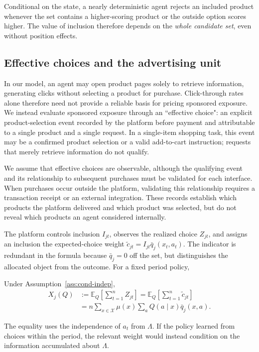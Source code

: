 \documentclass[opre,dblanonrev]{informs4}
\providecommand{\E}{\mathbb{E}}
\providecommand{\1}{\mathbf{1}}
\begin{document}
Conditional on the state, a nearly deterministic agent rejects an included product whenever the set contains a higher-scoring product or the outside option scores higher. The value of inclusion therefore depends on the \emph{whole candidate set}, even without position effects.


\subsection{Effective choices and the advertising unit}\label{sec:model-unit}

In our model, an agent may open product pages solely to retrieve information, generating clicks without selecting a product for purchase. Click-through rates alone therefore need not provide a reliable basis for pricing sponsored exposure. We instead evaluate sponsored exposure through an ``effective choice": an explicit product-selection event recorded by the platform before payment and attributable to a single product and a single request. In a single-item shopping task, this event may be a confirmed product selection or a valid add-to-cart instruction; requests that merely retrieve information do not qualify.

We assume that effective choices are observable, although the qualifying event and its relationship to subsequent purchases must be validated for each interface. When purchases occur outside the platform, validating this relationship requires a transaction receipt or an external integration. These records establish which products the platform delivered and which product was selected, but do not reveal which products an agent considered internally.

The platform controls inclusion $I_{jt}$, observes the realized choice $Z_{jt}$, and assigns an inclusion the expected-choice weight $\tilde c_{jt}=I_{jt}\bar q_j(x_t,a_t)$. The indicator is redundant in the formula because $\bar q_j=0$ off the set, but distinguishes the allocated object from the outcome. For a fixed period policy,
\begin{lemma}[Calibration]\label{lem:calibration}
Under Assumption~\ref{ass:cond-indep},
\begin{align*}
X_j(Q) &:= \E_Q\!\left[\sum_{t=1}^{n}Z_{jt}\right] = \E_Q\!\left[\sum_{t=1}^{n}\tilde c_{jt}\right] \\
&= n\sum_{x\in\mathcal X}\mu(x)\sum_a Q(a\mid x)\bar q_j(x,a).
\end{align*}
\end{lemma}
The equality uses the independence of $a_t$ from $\Lambda$. If the policy learned from choices within the period, the relevant weight would instead condition on the information accumulated about $\Lambda$.
\end{document}
